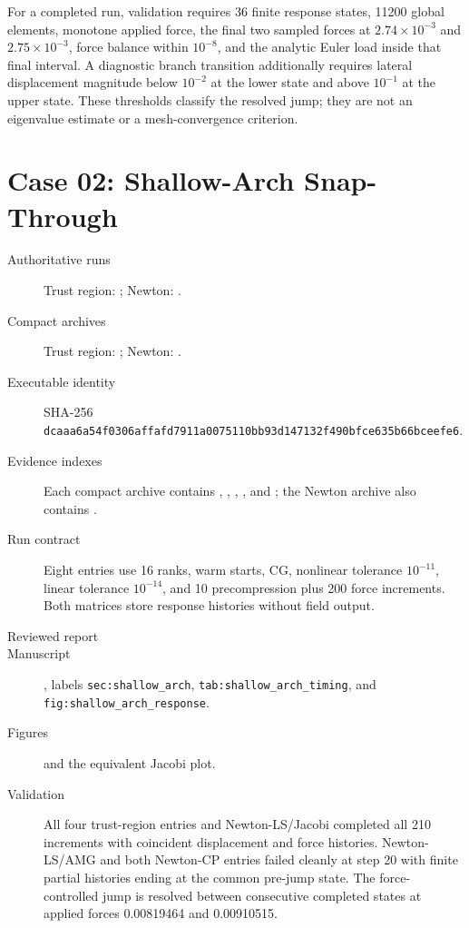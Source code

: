 \documentclass[11pt]{article}
\newcommand{\sha}[2]{\texttt{#1}\allowbreak\texttt{#2}}
\begin{document}
For a completed run, validation requires 36 finite response states, 11200 global
elements, monotone applied force, the final two sampled forces at
$2.74\times10^{-3}$ and $2.75\times10^{-3}$, force balance within $10^{-8}$,
and the analytic Euler load inside that final interval.  A diagnostic branch
transition additionally requires lateral displacement magnitude below
$10^{-2}$ at the lower state and above $10^{-1}$ at the upper state.  These
thresholds classify the resolved jump; they are not an eigenvalue estimate or
a mesh-convergence criterion.

\section*{Case 02: Shallow-Arch Snap-Through}

\begin{description}
  \item[Authoritative runs] Trust region: ; Newton: .
  \item[Compact archives] Trust region: ; Newton: .
  \item[Executable identity] SHA-256 \sha{dcaaa6a54f0306affafd7911a0075110}{bb93d147132f490bfce635b66bceefe6}.
  \item[Evidence indexes] Each compact archive contains , , , , and ; the Newton archive also contains .
  \item[Run contract] Eight entries use 16 ranks, warm starts, CG, nonlinear tolerance $10^{-11}$, linear tolerance $10^{-14}$, and 10 precompression plus 200 force increments.  Both matrices store response histories without field output.
  \item[Reviewed report] 
  \item[Manuscript] , labels \texttt{sec:shallow\_arch}, \texttt{tab:shallow\_arch\_timing}, and \texttt{fig:shallow\_arch\_response}.
  \item[Figures]  and the equivalent Jacobi plot.
  \item[Validation] All four trust-region entries and Newton-LS/Jacobi completed all 210 increments with coincident displacement and force histories. Newton-LS/AMG and both Newton-CP entries failed cleanly at step 20 with finite partial histories ending at the common pre-jump state. The force-controlled jump is resolved between consecutive completed states at applied forces 0.00819464 and 0.00910515.
\end{description}
\end{document}
